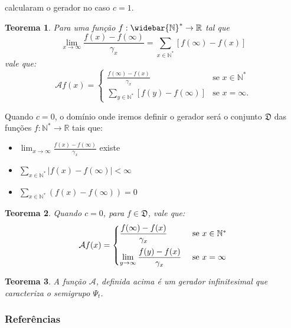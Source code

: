 \documentclass[xcolor=pdftex,dvipsnames]{beamer}
\newcommand{\AAA}{{\mathcal{A}}}
\newcommand{\DDD}{{\mathfrak{D}}}
\newcommand{\Nz}{{\mathbb{N^*}}}
\newcommand{\Nzb}{{\mathbb{\widebar{N}^*}}}
\newcommand{\R}{{\mathbb{R}}}
\newtheorem{teorema}{Teorema}
\begin{document}
\begin{frame}
  \cite{kendall:56} calcularam o gerador no caso $c = 1$.

  \begin{teorema}
  Para uma função $f: \Nzb \to \R$ tal que
  \begin{displaymath}
    \lim_{x \to \infty}
    \frac{f(x) - f(\infty)}{\gamma_x} = \sum_{x \in \Nz}
    [f(\infty) - f(x)]
  \end{displaymath}
  vale que:
  \begin{displaymath}
    \AAA f (x) = \begin{cases}
      \displaystyle
      \frac{f(\infty) - f(x)}{\gamma_x} & \text{se } x \in \Nz\\
      \displaystyle
      \sum_{y\in \Nz} [f(y) - f(\infty)] & \text{se } x = \infty.
    \end{cases}
  \end{displaymath}
\end{teorema}
\end{frame}

\begin{frame}

  Quando $c = 0$, o domínio onde iremos definir o gerador será 
  o conjunto $\DDD$ das funções $f: \Nz \to \R$ tais que:

  \begin{itemize}
  \item $\displaystyle \lim_{x \to \infty} \frac{f(x) -
      f(\infty)}{\gamma_x}$ existe
  \item $\displaystyle \sum_{x\in \Nz} |f(x)-f(\infty)| < \infty$
  \item $\displaystyle \sum_{x\in \Nz} \left( f(x)-f(\infty)\right) = 0$
  \end{itemize}  
\end{frame}

\begin{frame}

  \begin{teorema}
    Quando $c = 0$, para $f \in \DDD$, vale que:
    \begin{displaymath}
      \AAA f (x) = \begin{cases}
        \displaystyle
        \frac{f(\infty) - f(x)}{\gamma_x} & \text{ se } x \in \Nz \vspace{2mm}\\
        \displaystyle
        \lim_{y \to \infty} \frac{f(y) - f(x)}{\gamma_x} & \text{ se } x=\infty\\
      \end{cases}
    \end{displaymath}
  \end{teorema}
  \pause
  \begin{teorema}
    A função $\AAA$, definida acima é um gerador infinitesimal que
    caracteriza o semigrupo $\Psi_t$.
  \end{teorema}
\end{frame}



\begin{frame}[plain]
  \frametitle{Referências}
   
   
\end{frame}
\end{document}
